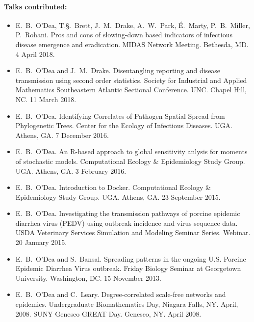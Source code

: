 \documentclass[a4paper]{article}
\begin{document}
\paragraph{Talks contributed:}
\begin{itemize}
\item[~] E.\ B.\ O'Dea, T.\S.\ Brett, J.\ M.\ Drake, A.\ W.\ Park,
  \'{E}.\ Marty, P.\ B.\ Miller, P.\ Rohani. Pros and cons of
  slowing-down based indicators of infectious disease emergence and
  eradication. MIDAS Network Meeting. Bethesda, MD. 4 April 2018.
\item[~] E.\ B.\ O'Dea and J.\ M.\ Drake. Disentangling reporting and
  disease transmission using second order statistics. Society for
  Industrial and Applied Mathematics Southeastern Atlantic Sectional
  Conference. UNC. Chapel Hill, NC. 11 March 2018.
\item[~] E.\ B.\ O'Dea. Identifying Correlates of Pathogen Spatial
  Spread from Phylogenetic Trees. Center for the Ecology of Infectious
  Diseases. UGA. Athens, GA. 7 December 2016.
\item[~] E.\ B.\ O'Dea. An R-based approach to global sensitivity
  anlysis for moments of stochastic models. Computational Ecology
  \& Epidemiology Study Group. UGA. Athens, GA. 3 February 2016.
\item[~] E.\ B.\ O'Dea. Introduction to Docker. Computational Ecology
  \& Epidemiology Study Group. UGA. Athens, GA. 23 September 2015.
\item[~] E.\ B.\ O'Dea. Investigating the transmission pathways of
  porcine epidemic diarrhea virus (PEDV) using outbreak incidence and
  virus sequence data. USDA Veterinary Services Simulation and
  Modeling Seminar Series. Webinar. 20 January 2015.
\item[~] E.\ B.\ O'Dea and S.\ Bansal. Spreading patterns in the
  ongoing U.S. Porcine Epidemic Diarrhea Virus outbreak. Friday
  Biology Seminar at Georgetown University. Washington, DC. 15
  November 2013.
\item[~] E.\ B.\ O'Dea and C.\ Leary. Degree-correlated scale-free
  networks and epidemics.  Undergraduate Biomathematics Day, Niagara
  Falls, NY. April, 2008. SUNY Geneseo GREAT Day. Geneseo, NY. April
  2008.
\end{itemize}
\end{document}
